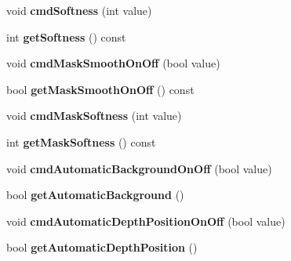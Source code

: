 \begin{DoxyCompactItemize}
\item 
\hypertarget{classTDVCameraInterfaceBase2_ab1d2c9cc2676b858c0dbf50035ee36f4}{
void {\bfseries cmdSoftness} (int value)}
\label{classTDVCameraInterfaceBase2_ab1d2c9cc2676b858c0dbf50035ee36f4}

\item 
\hypertarget{classTDVCameraInterfaceBase2_a3cc4d16af60928ede441533b47792db0}{
int {\bfseries getSoftness} () const }
\label{classTDVCameraInterfaceBase2_a3cc4d16af60928ede441533b47792db0}

\item 
\hypertarget{classTDVCameraInterfaceBase2_a278bad41877f7cc67010513edddcb371}{
void {\bfseries cmdMaskSmoothOnOff} (bool value)}
\label{classTDVCameraInterfaceBase2_a278bad41877f7cc67010513edddcb371}

\item 
\hypertarget{classTDVCameraInterfaceBase2_a5a643241c1c220a61ecf0c0a22e58229}{
bool {\bfseries getMaskSmoothOnOff} () const }
\label{classTDVCameraInterfaceBase2_a5a643241c1c220a61ecf0c0a22e58229}

\item 
\hypertarget{classTDVCameraInterfaceBase2_a7fd8c3ef57e1a603d8341e1b8f605d82}{
void {\bfseries cmdMaskSoftness} (int value)}
\label{classTDVCameraInterfaceBase2_a7fd8c3ef57e1a603d8341e1b8f605d82}

\item 
\hypertarget{classTDVCameraInterfaceBase2_aa9e8296220d1f6dfd0b3e80b186ce2fc}{
int {\bfseries getMaskSoftness} () const }
\label{classTDVCameraInterfaceBase2_aa9e8296220d1f6dfd0b3e80b186ce2fc}

\item 
\hypertarget{classTDVCameraInterfaceBase2_a79660c40a44100ab0162dc1691d742ad}{
void {\bfseries cmdAutomaticBackgroundOnOff} (bool value)}
\label{classTDVCameraInterfaceBase2_a79660c40a44100ab0162dc1691d742ad}

\item 
\hypertarget{classTDVCameraInterfaceBase2_a06af73ceaff68f12f4854ba1eb529c08}{
bool {\bfseries getAutomaticBackground} ()}
\label{classTDVCameraInterfaceBase2_a06af73ceaff68f12f4854ba1eb529c08}

\item 
\hypertarget{classTDVCameraInterfaceBase2_a4267605549783aba6499aa07cf35f3d1}{
void {\bfseries cmdAutomaticDepthPositionOnOff} (bool value)}
\label{classTDVCameraInterfaceBase2_a4267605549783aba6499aa07cf35f3d1}

\item 
\hypertarget{classTDVCameraInterfaceBase2_a854c8f778aa3f13c66c2639b5905e428}{
bool {\bfseries getAutomaticDepthPosition} ()}
\label{classTDVCameraInterfaceBase2_a854c8f778aa3f13c66c2639b5905e428}


\end{DoxyCompactItemize}
